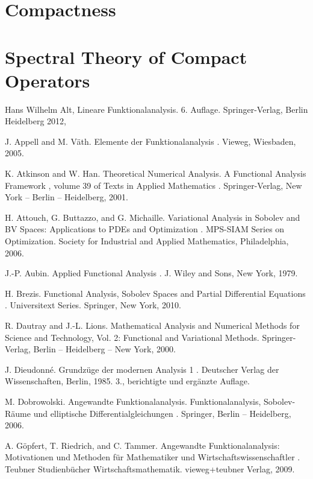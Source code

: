 \documentclass[draft=false]{scrreprt}
\begin{document}
\chapter{Compactness}


\chapter{Spectral Theory of Compact Operators}


\clearpage
\begin{thebibliography}{10}



  \label{bib:hWalt}
Hans Wilhelm Alt,  Lineare
Funktionalanalysis. 6. Auflage. Springer-Verlag, Berlin Heidelberg 2012,

\bibitem{} J. Appell and M. V\"ath. Elemente der Funktionalanalysis . Vieweg, Wiesbaden, 2005.

\bibitem{} K. Atkinson and W. Han. Theoretical Numerical Analysis. A Functional Analysis
Framework , volume
39 of Texts in Applied Mathematics . Springer-Verlag, New York – Berlin –
Heidelberg, 2001.

\bibitem{} H. Attouch, G. Buttazzo, and G. Michaille. Variational Analysis in Sobolev and BV
Spaces: Applications
to PDEs and Optimization . MPS-SIAM Series on Optimization. Society for Industrial and
Applied Mathematics, Philadelphia, 2006.

\bibitem{} J.-P. Aubin. Applied Functional Analysis . J. Wiley and Sons, New York, 1979.


\bibitem{}H. Brezis. Functional Analysis, Sobolev Spaces and Partial Differential Equations .
Universitext
Series. Springer, New York, 2010.

\bibitem{} R. Dautray and J.-L. Lions. Mathematical Analysis and Numerical Methods for Science
and Technology,
Vol. 2: Functional and Variational Methods.  Springer-Verlag, Berlin – Heidelberg –
New York,
2000.


\bibitem{} J. Dieudonn\'e. Grundzüge der modernen Analysis 1 . Deutscher Verlag der
Wissenschaften, Berlin,
1985. 3., berichtigte und erg\"anzte Auflage.

\bibitem{}M. Dobrowolski. Angewandte Funktionalanalysis. Funktionalanalysis, Sobolev-R\"aume
und elliptische
Differentialgleichungen . Springer, Berlin – Heidelberg, 2006.

\bibitem{} A. Göpfert, T. Riedrich, and C. Tammer. Angewandte Funktionalanalysis:
Motivationen und Methoden
für Mathematiker und Wirtschaftswissenschaftler . Teubner Studienbücher
Wirtschaftsmathematik.
vieweg+teubner Verlag, 2009.


\end{thebibliography}
\end{document}
